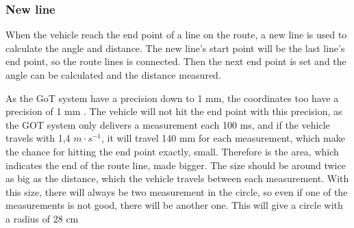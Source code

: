 \subsubsection{New line}
When the vehicle reach the end point of a line on the route, a new line is used to calculate the angle and distance. The new line's start point will be the last line's end point, so the route lines is connected. Then the next end point is set and the angle can be calculated and the distance measured.

As the GoT system have a precision down to 1 mm, the coordinates too have a precision of 1 mm . The vehicle will not hit the end point with this precision, as the GOT system only delivers a measurement each 100 ms, and if the vehicle travels with 1,4 $m \cdot s^{-1}$, it will travel 140 mm for each measurement, which make the chance for hitting the end point exactly, small. Therefore is the area, which indicates the end of the route line, made bigger. The size should be around twice as big as the distance, which the vehicle travels between each measurement. With this size, there will always be two measurement in the circle, so even if one of the measurements is not good, there will be another one. This will give a circle with a radius of 28 cm



